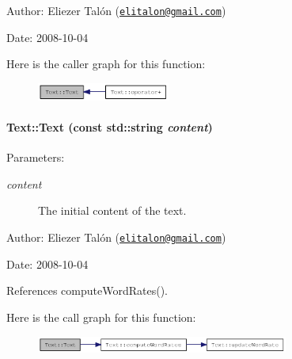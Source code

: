 \begin{Desc}
\item[Author:]Eliezer Talón (\href{mailto:elitalon@gmail.com}{\tt elitalon@gmail.com}) \end{Desc}
\begin{Desc}
\item[Date:]2008-10-04 \end{Desc}


Here is the caller graph for this function:\nopagebreak
\begin{figure}[H]
\begin{center}
\leavevmode
\includegraphics[width=124pt]{class_text_b3e26143fccc52699bcc5149cae852bc_icgraph}
\end{center}
\end{figure}
\hypertarget{class_text_c3c20ee8baeb7b88e2622724f57e50a2}{
\paragraph[{Text}]{\setlength{\rightskip}{0pt plus 5cm}Text::Text (const std::string {\em content})}\hfill}
\label{class_text_c3c20ee8baeb7b88e2622724f57e50a2}


\begin{Desc}
\item[Parameters:]
\begin{description}
\item[{\em content}]The initial content of the text.\end{description}
\end{Desc}
\begin{Desc}
\item[Author:]Eliezer Talón (\href{mailto:elitalon@gmail.com}{\tt elitalon@gmail.com}) \end{Desc}
\begin{Desc}
\item[Date:]2008-10-04 \end{Desc}


References computeWordRates().

Here is the call graph for this function:\nopagebreak
\begin{figure}[H]
\begin{center}
\leavevmode
\includegraphics[width=235pt]{class_text_c3c20ee8baeb7b88e2622724f57e50a2_cgraph}
\end{center}
\end{figure}


